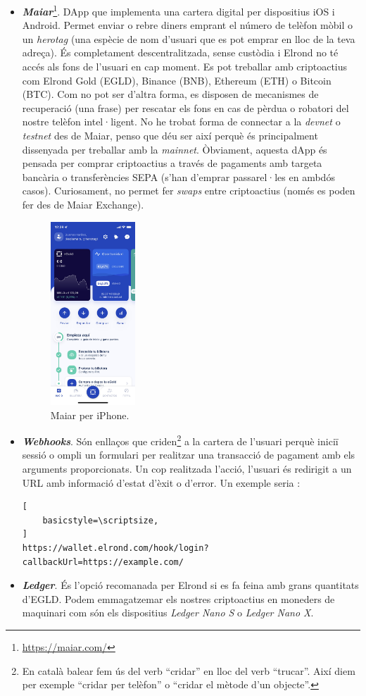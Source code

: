 \documentclass[11pt,a4paper]{article}
\begin{document}
\begin{itemize}
\item \textbf{\textit{Maiar}}\footnote{\url{https://maiar.com/}}. DApp que implementa una cartera digital per dispositius iOS i Android. Permet enviar o rebre diners emprant el número de telèfon mòbil o un \textit{herotag} (una espècie de nom d'usuari que es pot emprar en lloc de la teva adreça). És completament descentralitzada, sense custòdia i Elrond no té accés als fons de l'usuari en cap moment. Es pot treballar amb criptoactius com Elrond Gold (EGLD), Binance (BNB), Ethereum (ETH) o Bitcoin (BTC). Com no pot ser d'altra forma, es disposen de mecanismes de recuperació (una frase) per rescatar els fons en cas de pèrdua o robatori del nostre telèfon intel·ligent. No he trobat forma de connectar a la \textit{devnet} o \textit{testnet} des de Maiar, penso que déu ser així perquè és principalment dissenyada per treballar amb la \textit{mainnet}. Òbviament, aquesta dApp és pensada per comprar criptoactius a través de pagaments amb targeta bancària o transferències SEPA (s'han d'emprar passarel·les en ambdós casos). Curiosament, no permet fer \textit{swaps} entre criptoactius (només es poden fer des de Maiar Exchange).
\begin{figure}[h]
\includegraphics[width=0.3\textwidth]{maiarapp.png}
\centering
\caption{Maiar per iPhone.}\label{fig:maiarapp}
\end{figure} 
\item \textbf{\textit{Webhooks}}. Són enllaços que criden\footnote{En català balear fem ús del verb ``cridar'' en lloc del verb ``trucar''. Així diem per exemple ``cridar per telèfon'' o ``cridar el mètode d'un objecte''.} a la cartera de l'usuari perquè iniciï sessió o ompli un formulari per realitzar una transacció de pagament amb els arguments proporcionats. Un cop realitzada l'acció, l'usuari és redirigit a un URL amb informació d'estat d'èxit o d'error. Un exemple seria \cite{elrond2022}:
\begin{lstlisting}[
    basicstyle=\scriptsize,
]
https://wallet.elrond.com/hook/login?callbackUrl=https://example.com/
\end{lstlisting}
\item \textbf{\textit{Ledger}}. És l'opció recomanada per Elrond si es fa feina amb grans quantitats d'EGLD. Podem emmagatzemar els nostres criptoactius en moneders de maquinari com són els dispositius \textit{Ledger Nano S} o \textit{Ledger Nano X}.
\end{itemize}
\end{document}
